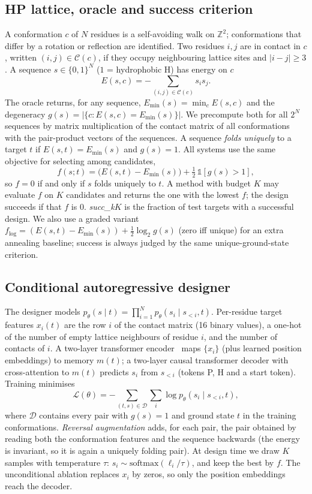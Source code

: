 \subsection{HP lattice, oracle and success criterion}
A conformation $c$ of $N$ residues is a self-avoiding walk on $\mathbb{Z}^2$; conformations that differ by a rotation or reflection are identified. Two residues $i,j$ are in contact in $c$, written $(i,j)\in\mathcal{C}(c)$, if they occupy neighbouring lattice sites and $|i-j|\ge 3$. A sequence $s\in\{0,1\}^N$ ($1$ = hydrophobic H) has energy on $c$
\begin{equation}
E(s,c) = -\sum_{(i,j)\in\mathcal{C}(c)} s_i s_j .
\end{equation}
The oracle returns, for any sequence, $E_{\min}(s)=\min_c E(s,c)$ and the degeneracy $g(s)=|\{c: E(s,c)=E_{\min}(s)\}|$. We precompute both for all $2^N$ sequences by matrix multiplication of the contact matrix of all conformations with the pair-product vectors of the sequences. A sequence \emph{folds uniquely} to a target $t$ if $E(s,t)=E_{\min}(s)$ and $g(s)=1$. All systems use the same objective for selecting among candidates,
\begin{equation}
f(s;t)=\big(E(s,t)-E_{\min}(s)\big)+\tfrac12\,\mathbb{1}[g(s)>1],
\end{equation}
so $f=0$ if and only if $s$ folds uniquely to $t$. A method with budget $K$ may evaluate $f$ on $K$ candidates and returns the one with the lowest $f$; the design succeeds if that $f$ is $0$. \emph{succ\_k$K$} is the fraction of test targets with a successful design. We also use a graded variant $f_{\log}=(E(s,t)-E_{\min}(s))+\tfrac12\log_2 g(s)$ (zero iff unique) for an extra annealing baseline; success is always judged by the same unique-ground-state criterion.

\subsection{Conditional autoregressive designer}
The designer models $p_\theta(s\mid t)=\prod_{i=1}^{N}p_\theta(s_i\mid s_{<i},t)$. Per-residue target features $x_i(t)$ are the row $i$ of the contact matrix (16 binary values), a one-hot of the number of empty lattice neighbours of residue $i$, and the number of contacts of $i$. A two-layer transformer encoder~\cite{vaswani2017attention} maps $\{x_i\}$ (plus learned position embeddings) to memory $m(t)$; a two-layer causal transformer decoder with cross-attention to $m(t)$ predicts $s_i$ from $s_{<i}$ (tokens P, H and a start token). Training minimises
\begin{equation}
\mathcal{L}(\theta)=-\sum_{(t,s)\in\mathcal{D}}\sum_{i}\log p_\theta(s_i\mid s_{<i},t),
\end{equation}
where $\mathcal{D}$ contains every pair with $g(s)=1$ and ground state $t$ in the training conformations. \emph{Reversal augmentation} adds, for each pair, the pair obtained by reading both the conformation features and the sequence backwards (the energy is invariant, so it is again a uniquely folding pair). At design time we draw $K$ samples with temperature $\tau$: $s_i\sim\mathrm{softmax}(\ell_i/\tau)$, and keep the best by $f$. The unconditional ablation replaces $x_i$ by zeros, so only the position embeddings reach the decoder.

